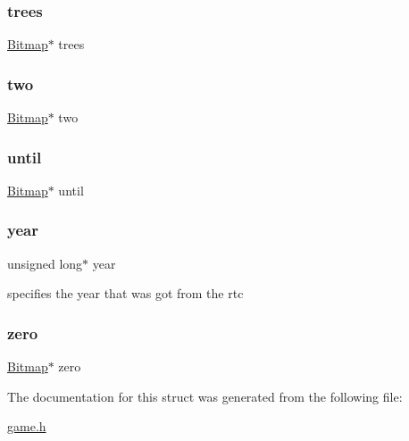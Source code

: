 \mbox{\label{struct_game_a7c5470289da6d158c774b458b9343b74}} 
\subsubsection{\texorpdfstring{trees}{trees}}
{\footnotesize\ttfamily \hyperlink{struct_bitmap}{Bitmap}$\ast$ trees}

\mbox{\label{struct_game_a32936da30300812ec66f54fee0a61b61}} 
\subsubsection{\texorpdfstring{two}{two}}
{\footnotesize\ttfamily \hyperlink{struct_bitmap}{Bitmap}$\ast$ two}

\mbox{\label{struct_game_a6d2d795903f1107dcc2027bbd8de5f43}} 
\subsubsection{\texorpdfstring{until}{until}}
{\footnotesize\ttfamily \hyperlink{struct_bitmap}{Bitmap}$\ast$ until}

\mbox{\label{struct_game_a30df4f508d48870f42ddeb4f1519c737}} 
\subsubsection{\texorpdfstring{year}{year}}
{\footnotesize\ttfamily unsigned long$\ast$ year}



specifies the year that was got from the rtc 

\mbox{\label{struct_game_a91347817cce11b30126d7223757eecaa}} 
\subsubsection{\texorpdfstring{zero}{zero}}
{\footnotesize\ttfamily \hyperlink{struct_bitmap}{Bitmap}$\ast$ zero}



The documentation for this struct was generated from the following file\+:\begin{DoxyCompactItemize}
\item 
\hyperlink{game_8h}{game.\+h}\end{DoxyCompactItemize}

